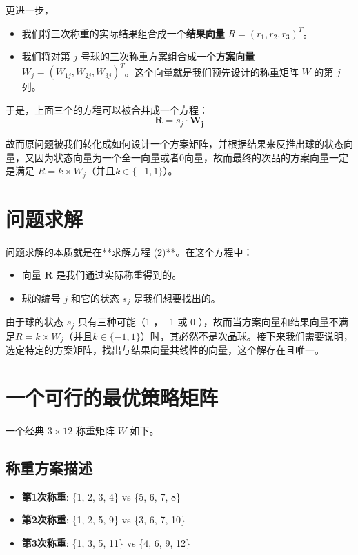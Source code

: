 \documentclass[12pt, a4paper]{ctexart}
\begin{document}
更进一步，
\begin{itemize}
    \item 我们将三次称重的实际结果组合成一个\textbf{结果向量} $R = (r_1, r_2, r_3)^T$。
    \item 我们将对第 $j$ 号球的三次称重方案组合成一个\textbf{方案向量} $W_j = (W_{1j}, W_{2j}, W_{3j})^T$。这个向量就是我们预先设计的称重矩阵 $W$ 的第 $j$ 列。
\end{itemize}
于是，上面三个的方程可以被合并成一个方程：
\begin{equation}
    \mathbf{R} = s_j \cdot \mathbf{W_j}
\end{equation}

故而原问题被我们转化成如何设计一个方案矩阵，并根据结果来反推出球的状态向量，又因为状态向量为一个全一向量或者0向量，故而最终的次品的方案向量一定是满足
$R = k \times W_j$（并且$k \in \{-1, 1\}$）。
\section{问题求解}

问题求解的本质就是在**求解方程 (2)**。在这个方程中：
\begin{itemize}
    \item 向量 $\mathbf{R}$ 是我们通过实际称重得到的。
    \item 球的编号 $j$ 和它的状态 $s_j$ 是我们想要找出的。
\end{itemize}
由于球的状态 $s_j$ 只有三种可能（1 ， -1 或 0 ），故而当方案向量和结果向量不满足$R = k \times W_j$（并且$k \in \{-1, 1\}$）时，其必然不是次品球。接下来我们需要说明，选定特定的方案矩阵，找出与结果向量共线性的向量，这个解存在且唯一。



\section{一个可行的最优策略矩阵}

一个经典 $3 \times 12$ 称重矩阵 $W$ 如下。

\subsection*{称重方案描述}
\begin{itemize}
    \item \textbf{第1次称重}: \{1, 2, 3, 4\} vs \{5, 6, 7, 8\}
    \item \textbf{第2次称重}: \{1, 2, 5, 9\} vs \{3, 6, 7, 10\}
    \item \textbf{第3次称重}: \{1, 3, 5, 11\} vs \{4, 6, 9, 12\}
\end{itemize}
\end{document}
